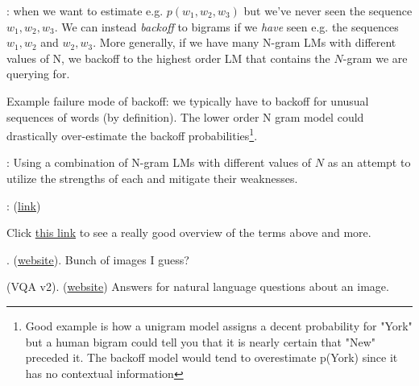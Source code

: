 \documentclass[11pt]{article}
\begin{document}
\begin{compactitem}
	\item {}: when we want to estimate e.g. $p(w_1, w_2, w_3)$ but we've never seen the sequence $w_1, w_2, w_3$. We can instead \textit{backoff} to bigrams if we \textit{have} seen e.g. the sequences $w_1, w_2$ and $w_2, w_3$. More generally, if we have many N-gram LMs with different values of N, we backoff to the highest order LM that contains the $N$-gram we are querying for.
	\begin{compactitem}
		\item Example failure mode of backoff: we typically have to backoff for unusual sequences of words (by definition). The lower order N gram model could drastically over-estimate the backoff probabilities\footnote{Good example is how a unigram model assigns a decent probability for "York" but a human bigram could tell you that it is nearly certain that "New" preceded it. The backoff model would tend to overestimate p(York) since it has no contextual information}.
	\end{compactitem}
	
	\item {}: Using a combination of N-gram LMs with different values of $N$ as an attempt to utilize the strengths of each and mitigate their weaknesses.
	
	\item {}: (\href{http://www.foldl.me/2014/kneser-ney-smoothing/}{link})
\end{compactitem}
Click \href{https://www.statmt.org/book/slides/07-language-models.pdf}{this link} to see a really good overview of the terms above and more.




\myspace
{}
\myspace

. (\href{http://cocodataset.org/#home}{website}). Bunch of images I guess?


 (VQA v2). (\href{https://visualqa.org}{website}) Answers for natural language questions about an image. \\
\end{document}
